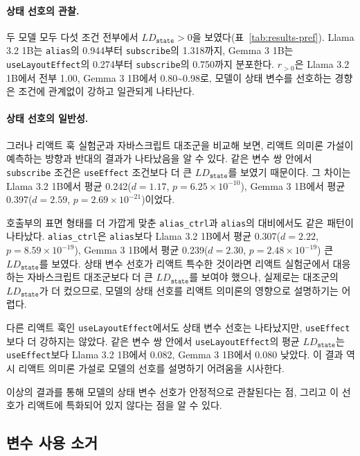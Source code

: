 \documentclass[11pt]{article}
\begin{document}
\paragraph{상태 선호의 관찰.}
두 모델 모두 다섯 조건 전부에서 $LD_{\texttt{state}} > 0$을 보였다(표~\ref{tab:results-pref}).
Llama 3.2 1B는 \texttt{alias}의 0.944부터 \texttt{subscribe}의 1.318까지, Gemma 3 1B는 \texttt{useLayoutEffect}의 0.274부터 \texttt{subscribe}의 0.750까지 분포한다.
$r_{>0}$은 Llama 3.2 1B에서 전부 1.00, Gemma 3 1B에서 0.80\~{}0.98로, 모델이 상태 변수를 선호하는 경향은 조건에 관계없이 강하고 일관되게 나타난다.

\paragraph{상태 선호의 일반성.}
그러나 리액트 훅 실험군과 자바스크립트 대조군을 비교해 보면, 리액트 의미론 가설이 예측하는 방향과 반대의 결과가 나타났음을 알 수 있다.
같은 변수 쌍 안에서 \texttt{subscribe} 조건은 \texttt{useEffect} 조건보다 더 큰 $LD_{\texttt{state}}$를 보였기 때문이다.
그 차이는 Llama 3.2 1B에서 평균 0.242($d=1.17$, $p=6.25\times10^{-10}$), Gemma 3 1B에서 평균 0.397($d=2.59$, $p=2.69\times10^{-21}$)이었다.

호출부의 표면 형태를 더 가깝게 맞춘 \texttt{alias\_ctrl}과 \texttt{alias}의 대비에서도 같은 패턴이 나타났다.
\texttt{alias\_ctrl}은 \texttt{alias}보다 Llama 3.2 1B에서 평균 0.307($d=2.22$, $p=8.59\times10^{-19}$), Gemma 3 1B에서 평균 0.239($d=2.30$, $p=2.48\times10^{-19}$) 큰 $LD_{\texttt{state}}$를 보였다.
상태 변수 선호가 리액트 특수한 것이라면 리액트 실험군에서 대응하는 자바스크립트 대조군보다 더 큰 $LD_{\texttt{state}}$를 보여야 했으나, 실제로는 대조군의 $LD_{\texttt{state}}$가 더 컸으므로, 모델의 상태 선호를 리액트 의미론의 영향으로 설명하기는 어렵다.

다른 리액트 훅인 \texttt{useLayoutEffect}에서도 상태 변수 선호는 나타났지만, \texttt{useEffect}보다 더 강하지는 않았다.
같은 변수 쌍 안에서 \texttt{useLayoutEffect}의 평균 $LD_{\texttt{state}}$는 \texttt{useEffect}보다 Llama 3.2 1B에서 0.082, Gemma 3 1B에서 0.080 낮았다.
이 결과 역시 리액트 의미론 가설로 모델의 선호를 설명하기 어려움을 시사한다.

이상의 결과를 통해 모델의 상태 변수 선호가 안정적으로 관찰된다는 점, 그리고 이 선호가 리액트에 특화되어 있지 않다는 점을 알 수 있다.

\subsection{변수 사용 소거}
\label{sec:results-bodyuse}
\end{document}
